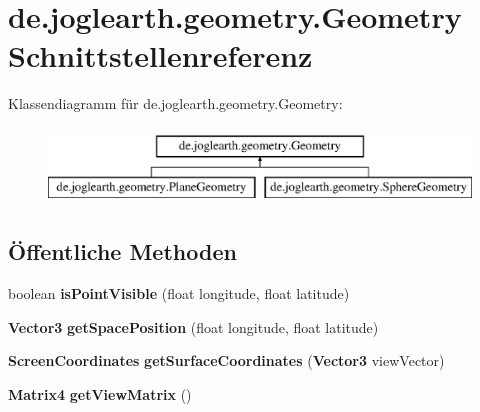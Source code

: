 \section{de.\-joglearth.\-geometry.\-Geometry Schnittstellenreferenz}
\label{interfacede_1_1joglearth_1_1geometry_1_1_geometry}
Klassendiagramm für de.\-joglearth.\-geometry.\-Geometry\-:\begin{figure}[H]
\begin{center}
\leavevmode
\includegraphics[height=2.000000cm]{interfacede_1_1joglearth_1_1geometry_1_1_geometry}
\end{center}
\end{figure}
\subsection*{Öffentliche Methoden}
\begin{DoxyCompactItemize}
\item 
boolean {\bfseries is\-Point\-Visible} (float longitude, float latitude)\label{interfacede_1_1joglearth_1_1geometry_1_1_geometry_a93795cd836dcab82a988dbe551bebe66}

\item 
{\bf Vector3} {\bfseries get\-Space\-Position} (float longitude, float latitude)\label{interfacede_1_1joglearth_1_1geometry_1_1_geometry_a6ea8d2148fc3396d7ed2c6be45c7e4cc}

\item 
{\bf Screen\-Coordinates} {\bfseries get\-Surface\-Coordinates} ({\bf Vector3} view\-Vector)\label{interfacede_1_1joglearth_1_1geometry_1_1_geometry_a65efb18a90aeacc6ba446c3cbf9f4787}

\item 
{\bf Matrix4} {\bfseries get\-View\-Matrix} ()\label{interfacede_1_1joglearth_1_1geometry_1_1_geometry_a30f45d30257e8fc7e9d6f91cf846cdda}

\end{DoxyCompactItemize}
